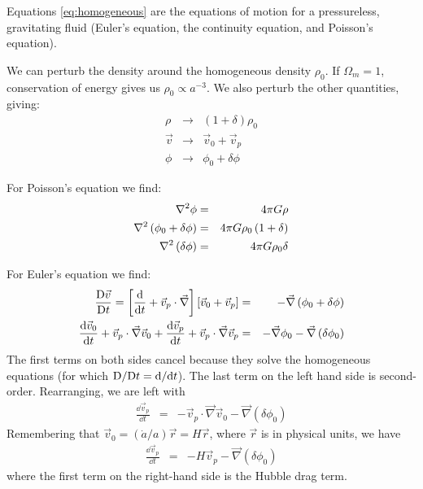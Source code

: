 \begin{enumerate}
\begin{answer}
Equations \ref{eq:homogeneous} are the equations of motion for a
pressureless, gravitating fluid (Euler's equation, the continuity
equation, and Poisson's equation).

We can perturb the density around the homogeneous density $\rho_0$.
If $\Omega_m = 1$, conservation of energy gives us $\rho_0
\propto a^{-3}$. We also perturb the other quantities, giving:
\begin{eqnarray}
\rho  &\rightarrow& (1+\delta)\rho_0 \\
\vec{v} &\rightarrow& \vec{v}_0 + \vec{v}_p \\
\phi  &\rightarrow& \phi_0 + \delta\phi
\end{eqnarray}

For Poisson's equation we find:
\begin{eqnarray}
\nabla^2\phi &=& 4\pi G \rho  \cr
\nabla^2\left(\phi_0 + \delta\phi\right) &=& 4\pi
G \rho_0\left(1+\delta\right)  \cr
\nabla^2\left(\delta\phi\right) &=& 4\pi G \rho_0 \delta
\end{eqnarray}

For Euler's equation we find:
\begin{eqnarray}
\frac{{\rm D}\vec{v}}{{\rm D} t} =
\left[ \frac{{\rm d}}{{\rm d}t} + \vec{v}_p \cdot \vec{\nabla} \right]
\left[\vec{v}_0 + \vec{v}_p\right] &=& - \vec{\nabla}\left(\phi_0
+ \delta\phi\right) \cr
\frac{{\rm d}\vec{v}_0}{{\rm d}t} + \vec{v}_p \cdot \vec{\nabla}\vec{v}_0
+ \frac{{\rm d}\vec{v}_p}{{\rm d}t} + \vec{v}_p \cdot \vec{\nabla}\vec{v}_p
&=& - \vec{\nabla}\phi_0 - \vec{\nabla}\left(\delta\phi_0\right)
\end{eqnarray}
The first terms on both sides cancel because they solve the
homogeneous equations (for which ${\rm D}/{\rm D}t
= {\rm d}/{\rm d}t$). The last term on the left hand side is
second-order. Rearranging, we are left with
\begin{eqnarray}
\frac{\dd{\vec{v}_p}}{\dd{t}}
&=& - \vec{v}_p \cdot \vec{\nabla}\vec{v}_0
- \vec{\nabla}\left(\delta\phi_0\right)
\end{eqnarray}
Remembering that $\vec{v}_0 = ({\dot a}/a)\vec{r} = H\vec{r}$, where
$\vec{r}$ is in physical units, we have
\begin{eqnarray}
\label{eq:dvdt}
\frac{\dd{\vec{v}_p}}{\dd{t}}
&=&
- H \vec{v}_p
- \vec{\nabla}\left(\delta\phi_0\right)
\end{eqnarray}
where the first term on the right-hand side is the Hubble drag term.


\end{answer}
\end{enumerate}
